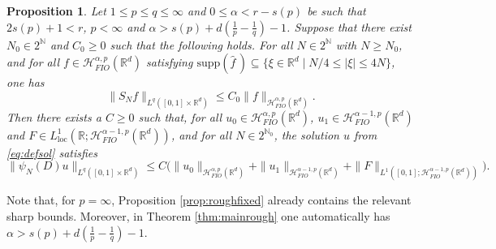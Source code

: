 \documentclass{amsart}
\numberwithin{equation}{section}
\newtheorem{proposition}[theorem]{Proposition}
\theoremstyle{definition}
\newcommand{\R}{\mathbb{R}}
\newcommand{\Rd}{\mathbb{R}^{d}}
\newcommand{\Rn}{\mathbb{R}^{d}}
\newcommand{\N}{\mathbb{N}}
\newcommand {\HT}{\mathcal{H}}
\newcommand {\loc}{\mathrm{loc}}
\newcommand {\supp}{\mathrm{supp}}
\newcommand {\wh}{\widehat}
\begin{document}
\begin{proposition}\label{prop:reduction}
Let $1\leq p\leq q\leq \infty$ and $0\leq \alpha<r-s(p)$ be such that $2s(p)+1<r$, $p<\infty$ and $\alpha>s(p)+d(\frac{1}{p}-\frac{1}{q})-1$. Suppose that there exist $N_{0}\in 2^{\N}$ %
and $C_{0}\geq0$ such that the following holds. For all $N\in 2^{\N}$ with $N\geq N_{0}$, %
and for all $f\in\HT^{\alpha,p}_{FIO}(\Rd)$ satisfying $\supp(\wh{f}\,)\subseteq \{\xi\in\Rn\mid N/4\leq |\xi|\leq 4N\}$, %
one has %
\begin{equation}\label{eq:reductionbound}
\|S_{N} f \|_{L^{q}([0,1]\times\Rd)}
\leq C_{0}\|f\|_{\HT^{\alpha,p}_{FIO}(\Rd)}.
\end{equation}
Then there exists a $C\geq0$ such that, for all $u_{0}\in \HT^{\alpha,p}_{FIO}(\R^d)$, $u_{1}\in \HT^{\alpha-1,p}_{FIO}(\R^d)$ and $F\in L^{1}_{\loc}(\R;\HT^{\alpha-1,p}_{FIO}(\R^d))$, and for all $N\in 2^{\N_{0}}$, the solution $u$ from \eqref{eq:defsol} satisfies %
\[
\|\psi_{N}(D)u\|_{L^{q}([0,1]\times\R^d)}\leq C\big(\|u_{0}\|_{\HT^{\alpha,p}_{FIO}(\R^d)}+\|u_{1}\|_{\HT^{\alpha-1,p}_{FIO}(\R^d)}+\|F\|_{L^{1}([0,1];\HT^{\alpha-1,p}_{FIO}(\R^d))}\big).
\]
\end{proposition}
Note that,  for $p=\infty$,  Proposition \ref{prop:roughfixed} already contains the relevant sharp bounds. Moreover, in Theorem \ref{thm:mainrough} one automatically has $\alpha>s(p)+d(\frac{1}{p}-\frac{1}{q})-1$. 
\end{document}
